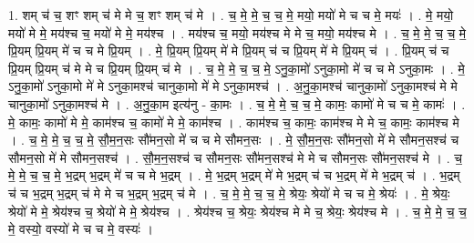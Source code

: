 \documentclass[17pt]{extarticle}
\begin{document}
1. शम् च॑ च॒ शꣳ शम् च॑ मे मे च॒ शꣳ शम् च॑ मे । . च॒ मे॒ मे॒ च॒ च॒ मे॒ मयो॒ मयो॑ मे च च मे॒ मयः॑ । . मे॒ मयो॒ मयो॑ मे मे॒ मय॑श्च च॒ मयो॑ मे मे॒ मय॑श्च । . मय॑श्च च॒ मयो॒ मय॑श्च मे मे च॒ मयो॒ मय॑श्च मे । . च॒ मे॒ मे॒ च॒ च॒ मे॒ प्रि॒यम् प्रि॒यम् मे॑ च च मे प्रि॒यम् । . मे॒ प्रि॒यम् प्रि॒यम् मे॑ मे प्रि॒यम् च॑ च प्रि॒यम् मे॑ मे प्रि॒यम् च॑ । . प्रि॒यम् च॑ च प्रि॒यम् प्रि॒यम् च॑ मे मे च प्रि॒यम् प्रि॒यम् च॑ मे । . च॒ मे॒ मे॒ च॒ च॒ मे॒ ऽनु॒का॒मो॑ ऽनुका॒मो मे॑ च च मे ऽनुका॒मः । . मे॒ ऽनु॒का॒मो॑ ऽनुका॒मो मे॑ मे ऽनुका॒मश्च॑ चानुका॒मो मे॑ मे ऽनुका॒मश्च॑ । . अ॒नु॒का॒मश्च॑ चानुका॒मो॑ ऽनुका॒मश्च॑ मे मे चानुका॒मो॑ ऽनुका॒मश्च॑ मे । . अ॒नु॒का॒म इत्य॑नु - का॒मः । . च॒ मे॒ मे॒ च॒ च॒ मे॒ कामः॒ कामो॑ मे च च मे॒ कामः॑ । . मे॒ कामः॒ कामो॑ मे मे॒ काम॑श्च च॒ कामो॑ मे मे॒ काम॑श्च । . काम॑श्च च॒ कामः॒ काम॑श्च मे मे च॒ कामः॒ काम॑श्च मे । . च॒ मे॒ मे॒ च॒ च॒ मे॒ सौ॒म॒न॒सः सौ॑मन॒सो मे॑ च च मे सौमन॒सः । . मे॒ सौ॒म॒न॒सः सौ॑मन॒सो मे॑ मे सौमन॒सश्च॑ च सौमन॒सो मे॑ मे सौमन॒सश्च॑ । . सौ॒म॒न॒सश्च॑ च सौमन॒सः सौ॑मन॒सश्च॑ मे मे च सौमन॒सः सौ॑मन॒सश्च॑ मे । . च॒ मे॒ मे॒ च॒ च॒ मे॒ भ॒द्रम् भ॒द्रम् मे॑ च च मे भ॒द्रम् । . मे॒ भ॒द्रम् भ॒द्रम् मे॑ मे भ॒द्रम् च॑ च भ॒द्रम् मे॑ मे भ॒द्रम् च॑ । . भ॒द्रम् च॑ च भ॒द्रम् भ॒द्रम् च॑ मे मे च भ॒द्रम् भ॒द्रम् च॑ मे । . च॒ मे॒ मे॒ च॒ च॒ मे॒ श्रेयः॒ श्रेयो॑ मे च च मे॒ श्रेयः॑ । . मे॒ श्रेयः॒ श्रेयो॑ मे मे॒ श्रेय॑श्च च॒ श्रेयो॑ मे मे॒ श्रेय॑श्च । . श्रेय॑श्च च॒ श्रेयः॒ श्रेय॑श्च मे मे च॒ श्रेयः॒ श्रेय॑श्च मे । . च॒ मे॒ मे॒ च॒ च॒ मे॒ वस्यो॒ वस्यो॑ मे च च मे॒ वस्यः॑ । \newline
\end{document}
